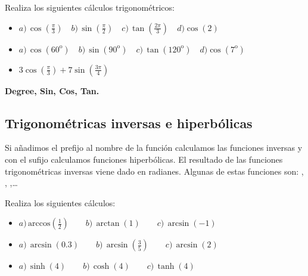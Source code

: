 \documentclass[a4paper,10pt, draft]{article}
\newcommand{\com}[1]{\textbf{\color{blue}{#1}}}
\newenvironment{ejer}{\begin{tcolorbox}[center title, title=Ejercicios,
fonttitle=\sffamily\bfseries,colback=blue!5,colframe=orange]}{\end{tcolorbox}}
\newenvironment{funciones}{\begin{tcolorbox}[center title, title=Nuevas funciones, fonttitle=\sffamily\bfseries, colback=green!5!white,colframe=red!75!black]}{\end{tcolorbox}\bigskip}
\begin{document}
 
 \begin{ejer}
 
Realiza los siguientes cálculos trigonométricos:


\begin{itemize}

\item $\displaystyle a)\, \cos\!\left(\frac{\pi}{3}\right)\quad b)\,\sin\!\left(\frac{\pi}{2}\right)\quad  c)\,\tan\!\left(\frac{2\pi}{3}\right) \quad d) \cos(2)$


 \item $\displaystyle a)\, \cos\!\left(60^\mathrm{o}\right)\quad  b)\,\sin\!\left(90^\mathrm{o}\right) \quad  \! c)\,\tan\!\left(120^\mathrm{o}\right)  \quad  \! d)\cos(7^\mathrm{o})$

\item $\displaystyle 3\cos\left(\frac{\pi}{3}\right)+7\sin\left(\frac{3\pi}{4}\right)$

\end{itemize}

\end{ejer} 

\enlargethispage{1 cm}

\begin{funciones}

\textbf{Degree, Sin, Cos, Tan.}


\end{funciones}

 \newpage

\subsection{Trigonométricas inversas  e hiperbólicas}

Si añadimos el prefijo \com{Arc} al nombre de la función calculamos las funciones inversas y con el sufijo \com{h} calculamos funciones hiperbólicas. El resultado de las funciones trigonométricas inversas viene dado en radianes. Algunas de estas funciones son: \com{ArcSin[x]}, \com{Cosh[x]}, \com{ArcTanh[x]},\dots

\begin{ejer}

Realiza los siguientes cálculos:

\begin{itemize}

\item  $\displaystyle a)\,\mathrm{arccos}\left(\frac{1}{2}\right) \qquad b)\, \arctan(1)\qquad c)\, \arcsin(-1)$

\item $\displaystyle  a)\, \arcsin(0.3) \qquad b)\,  \arcsin\left(\frac{3}{5}\right)\qquad c)\, \arcsin(2)$

\item  $\displaystyle a)\, \sinh(4)\qquad b)\, \cosh(4)\qquad c)\,\tanh(4)$

\end{itemize}

\end{ejer} 
\end{document}
